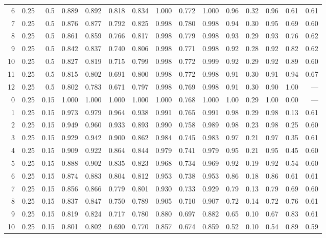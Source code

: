 \begin{landscape}
\begin{longtable}{rrrrrrrrrrrrrrr}
6 & 0.25 & 0.5 & 0.889 & 0.892 & 0.818 & 0.834 & 1.000 & 0.772 & 1.000 & 0.96 & 0.32 & 0.96 & 0.61 & 0.61 \\
7 & 0.25 & 0.5 & 0.876 & 0.877 & 0.792 & 0.825 & 0.998 & 0.780 & 0.998 & 0.94 & 0.30 & 0.95 & 0.69 & 0.60 \\
8 & 0.25 & 0.5 & 0.861 & 0.859 & 0.766 & 0.817 & 0.998 & 0.779 & 0.998 & 0.93 & 0.29 & 0.93 & 0.76 & 0.62 \\
9 & 0.25 & 0.5 & 0.842 & 0.837 & 0.740 & 0.806 & 0.998 & 0.771 & 0.998 & 0.92 & 0.28 & 0.92 & 0.82 & 0.62 \\
10 & 0.25 & 0.5 & 0.827 & 0.819 & 0.715 & 0.799 & 0.998 & 0.772 & 0.999 & 0.92 & 0.29 & 0.92 & 0.89 & 0.60 \\
11 & 0.25 & 0.5 & 0.815 & 0.802 & 0.691 & 0.800 & 0.998 & 0.772 & 0.998 & 0.91 & 0.30 & 0.91 & 0.94 & 0.67 \\
12 & 0.25 & 0.5 & 0.802 & 0.783 & 0.671 & 0.797 & 0.998 & 0.769 & 0.998 & 0.91 & 0.30 & 0.90 & 1.00 & --- \\
\midrule
0 & 0.25 & 0.15 & 1.000 & 1.000 & 1.000 & 1.000 & 1.000 & 0.768 & 1.000 & 1.00 & 0.29 & 1.00 & 0.00 & --- \\
1 & 0.25 & 0.15 & 0.973 & 0.979 & 0.964 & 0.938 & 0.991 & 0.765 & 0.991 & 0.98 & 0.29 & 0.98 & 0.13 & 0.61 \\
2 & 0.25 & 0.15 & 0.949 & 0.960 & 0.933 & 0.893 & 0.990 & 0.758 & 0.989 & 0.98 & 0.23 & 0.98 & 0.25 & 0.60 \\
3 & 0.25 & 0.15 & 0.929 & 0.942 & 0.900 & 0.862 & 0.984 & 0.745 & 0.983 & 0.97 & 0.21 & 0.97 & 0.35 & 0.61 \\
4 & 0.25 & 0.15 & 0.909 & 0.922 & 0.864 & 0.844 & 0.979 & 0.741 & 0.979 & 0.95 & 0.21 & 0.95 & 0.45 & 0.60 \\
5 & 0.25 & 0.15 & 0.888 & 0.902 & 0.835 & 0.823 & 0.968 & 0.734 & 0.969 & 0.92 & 0.19 & 0.92 & 0.54 & 0.60 \\
6 & 0.25 & 0.15 & 0.874 & 0.883 & 0.804 & 0.812 & 0.953 & 0.738 & 0.953 & 0.86 & 0.18 & 0.86 & 0.61 & 0.61 \\
7 & 0.25 & 0.15 & 0.856 & 0.866 & 0.779 & 0.801 & 0.930 & 0.733 & 0.929 & 0.79 & 0.13 & 0.79 & 0.69 & 0.60 \\
8 & 0.25 & 0.15 & 0.837 & 0.847 & 0.750 & 0.789 & 0.905 & 0.710 & 0.907 & 0.72 & 0.14 & 0.72 & 0.76 & 0.61 \\
9 & 0.25 & 0.15 & 0.819 & 0.824 & 0.717 & 0.780 & 0.880 & 0.697 & 0.882 & 0.65 & 0.10 & 0.67 & 0.83 & 0.61 \\
10 & 0.25 & 0.15 & 0.801 & 0.802 & 0.690 & 0.770 & 0.857 & 0.674 & 0.859 & 0.52 & 0.10 & 0.54 & 0.89 & 0.59 \\

\end{longtable}
\end{landscape}

